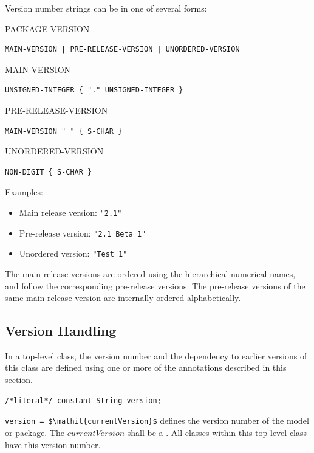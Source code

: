 Version number strings can be in one of several forms:

\begin{lexicalunit}{PACKAGE-VERSION}
\begin{lstlisting}
MAIN-VERSION | PRE-RELEASE-VERSION | UNORDERED-VERSION
\end{lstlisting}
\end{lexicalunit}

\begin{lexicalunit}{MAIN-VERSION}
\begin{lstlisting}
UNSIGNED-INTEGER { "." UNSIGNED-INTEGER }
\end{lstlisting}
\end{lexicalunit}

\begin{lexicalunit}{PRE-RELEASE-VERSION}
\begin{lstlisting}
MAIN-VERSION " " { S-CHAR }
\end{lstlisting}
\end{lexicalunit}

\begin{lexicalunit}{UNORDERED-VERSION}
\begin{lstlisting}
NON-DIGIT { S-CHAR }
\end{lstlisting}
\end{lexicalunit}

Examples:
\begin{itemize}
\item
  Main release version: \lstinline!"2.1"!
\item
  Pre-release version: \lstinline!"2.1 Beta 1"!
\item
  Unordered version: \lstinline!"Test 1"!
\end{itemize}

The main release versions are ordered using the hierarchical numerical names, and follow the corresponding pre-release versions.
The pre-release versions of the same main release version are internally ordered alphabetically.


\subsection{Version Handling}\label{version-handling}

In a top-level class, the version number and the dependency to earlier versions of this class are defined using one or more of the annotations described in this section.

\begin{annotationdefinition}[version]
\begin{synopsis}\begin{lstlisting}
/*literal*/ constant String version;
\end{lstlisting}\end{synopsis}
\begin{semantics}
\lstinline!version = $\mathit{currentVersion}$! defines the version number of the model or package.
The $\mathit{currentVersion}$ shall be a .
All classes within this top-level class have this version number.
\end{semantics}
\end{annotationdefinition}

